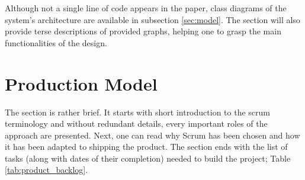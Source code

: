 \documentclass{report}
\begin{document}
Although not a single line of code appears in the paper, class diagrams of the system's architecture are available in subsection \ref{sec:model}. The section will also provide terse descriptions of provided graphs, helping one to grasp the main functionalities of the design. 


\section{Production Model} \label{sec:production_model}
The section is rather brief. It starts with short introduction to the scrum terminology and without redundant details, every important roles of the approach are presented. Next, one can read why Scrum has been chosen and how it has been adapted to shipping the product. The section ends with the list of tasks (along with dates of their completion) needed to build the project; Table \ref{tab:product_backlog}.
\end{document}
